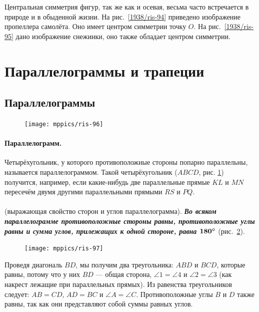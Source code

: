 \documentclass[twoside]{book}
\begin{document}
Центральная симметрия фигур, так же как и осевая, весьма часто встречается в природе и в обыденной жизни.
На рис.~\ref{1938/ris-94} приведено изображение пропеллера самолёта.
Оно имеет центром симметрии точку $O$.
На рис.~\ref{1938/ris-95} дано изображение снежинки, оно также обладает центром симметрии.

\section{Параллелограммы и трапеции}

\subsection*{Параллелограммы}

{

\begin{figure}
\vskip-5mm
\centering
\texttt{[image: mppics/ris-96]}
\caption{}\label{1938/ris-96}
\end{figure}

\paragraph{Параллелограмм.}\label{1938/87}
Четырёхугольник, у которого противоположные стороны попарно параллельны, называется параллелограммом.
Такой четырёхугольник ($ABCD$, рис. \ref{1938/ris-96}) получится, например, если какие-нибудь две параллельные прямые $KL$ и $MN$ пересечём двумя другими параллельными прямыми $RS$ и $PQ$.

}

\paragraph{}\label{1938/88}
\mbox{} (выражающая свойство сторон и углов параллелограмма).
\textbf{\emph{Во всяком параллелограмме противоположные стороны равны, противоположные углы равны и сумма углов, прилежащих к одной стороне, равна $\bm{180\degree}$}} (рис.~\ref{1938/ris-97}).

\begin{figure}
\centering
\texttt{[image: mppics/ris-97]}
\caption{}\label{1938/ris-97}
\end{figure}

Проведя диагональ $BD$, мы получим два треугольника:
$ABD$ и $BCD$, которые равны, потому что у них $BD$ — общая сторона, $\angle 1 = \angle 4$ и $\angle 2 = \angle 3$ (как накрест лежащие при параллельных прямых).
Из равенства треугольников следует:
$AB=CD$, $AD=BC$ и $\angle A = \angle C$.
Противоположные углы $B$ и $D$ также равны, так как они представляют собой суммы равных углов.
\end{document}
